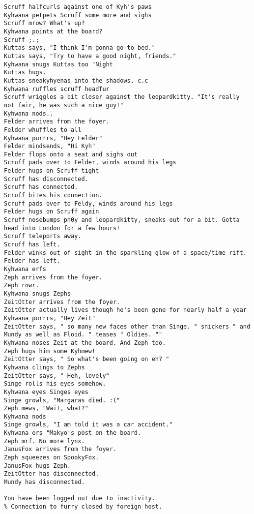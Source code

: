 \begin{verbatim}
Scruff halfcurls against one of Kyh's paws
Kyhwana petpets Scruff some more and sighs
Scruff mrow? What's up?
Kyhwana points at the board?
Scruff ;.;
Kuttas says, "I think I'm gonna go to bed."
Kuttas says, "Try to have a good night, friends."
Kyhwana snugs Kuttas too "Night
Kuttas hugs.
Kuttas sneakyhyenas into the shadows. c.c
Kyhwana ruffles scruff headfur
Scruff wriggles a bit closer against the leopardkitty. "It's really not fair, he was such a nice guy!"
Kyhwana nods..
Felder arrives from the foyer.
Felder whuffles to all
Kyhwana purrrs, "Hey Felder"
Felder mindsends, "Hi Kyh"
Felder flops onto a seat and sighs out
Scruff pads over to Felder, winds around his legs
Felder hugs on Scruff tight
Scruff has disconnected.
Scruff has connected.
Scruff bites his connection.
Scruff pads over to Feldy, winds around his legs
Felder hugs on Scruff again
Scruff nosebumps pn0y and leopardkitty, sneaks out for a bit. Gotta head into London for a few hours!
Scruff teleports away.
Scruff has left.
Felder winks out of sight in the sparkling glow of a space/time rift.
Felder has left.
Kyhwana erfs
Zeph arrives from the foyer.
Zeph rowr.
Kyhwana snugs Zephs
ZeitOtter arrives from the foyer.
ZeitOtter actually lives though he's been gone for nearly half a year
Kyhwana purrrs, "Hey Zeit"
ZeitOtter says, " so many new faces other than Singe. " snickers " and Mundy as well as Floid. " teases " Oldies. ""
Kyhwana noses Zeit at the board. And Zeph too.
Zeph hugs him some Kyhmew!
ZeitOtter says, " So what's been going on eh? "
Kyhwana clings to Zephs
ZeitOtter says, " Heh, lovely"
Singe rolls his eyes somehow.
Kyhwana eyes Singes eyes
Singe growls, "Margaras died. :("
Zeph mews, "Wait, what?"
Kyhwana nods
Singe growls, "I am told it was a car accident."
Kyhwana ers "Makyo's post on the board.
Zeph mrf. No more lynx.
JanusFox arrives from the foyer.
Zeph squeezes on SpookyFox.
JanusFox hugs Zeph.
ZeitOtter has disconnected.
Mundy has disconnected.

You have been logged out due to inactivity.
% Connection to furry closed by foreign host.
\end{verbatim}
\newpage

